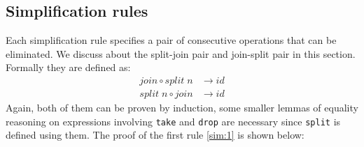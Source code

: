 \documentclass{l4proj}
\begin{document}
\subsection{Simplification rules}
\label{alg:simplification}
Each simplification rule specifies a pair of consecutive operations that can be eliminated. We discuss about the split-join pair and join-split pair in this section. Formally they are defined as:
\begin{align}
    \label{sim:1}
    join \circ split\; n &\to id \\
    \label{sim:2}
    split\; n \circ join &\to id
\end{align}
Again, both of them can be proven by induction, some smaller lemmas of equality reasoning on expressions involving \texttt{take} and \texttt{drop} are necessary since \texttt{split} is defined using them. The proof of the first rule \ref{sim:1} is shown below:
\end{document}
